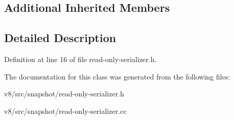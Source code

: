 \subsection*{Additional Inherited Members}


\subsection{Detailed Description}


Definition at line 16 of file read-\/only-\/serializer.\+h.



The documentation for this class was generated from the following files\+:\begin{DoxyCompactItemize}
\item 
v8/src/snapshot/read-\/only-\/serializer.\+h\item 
v8/src/snapshot/read-\/only-\/serializer.\+cc\end{DoxyCompactItemize}
